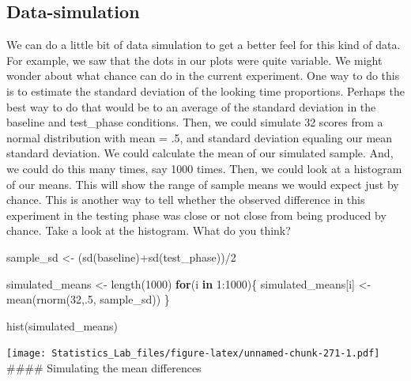 \documentclass[
]{book}
\newenvironment{Shaded}{\begin{snugshade}}{\end{snugshade}}
\newcommand{\ControlFlowTok}[1]{\textcolor[rgb]{0.13,0.29,0.53}{\textbf{#1}}}
\newcommand{\DecValTok}[1]{\textcolor[rgb]{0.00,0.00,0.81}{#1}}
\newcommand{\FunctionTok}[1]{\textcolor[rgb]{0.00,0.00,0.00}{#1}}
\newcommand{\NormalTok}[1]{#1}
\newcommand{\OtherTok}[1]{\textcolor[rgb]{0.56,0.35,0.01}{#1}}
\newcommand{\SpecialCharTok}[1]{\textcolor[rgb]{0.00,0.00,0.00}{#1}}
\begin{document}
\hypertarget{data-simulation}{%
\subsection{Data-simulation}\label{data-simulation}}

We can do a little bit of data simulation to get a better feel for this kind of data. For example, we saw that the dots in our plots were quite variable. We might wonder about what chance can do in the current experiment. One way to do this is to estimate the standard deviation of the looking time proportions. Perhaps the best way to do that would be to an average of the standard deviation in the baseline and test\_phase conditions. Then, we could simulate 32 scores from a normal distribution with mean = .5, and standard deviation equaling our mean standard deviation. We could calculate the mean of our simulated sample. And, we could do this many times, say 1000 times. Then, we could look at a histogram of our means. This will show the range of sample means we would expect just by chance. This is another way to tell whether the observed difference in this experiment in the testing phase was close or not close from being produced by chance. Take a look at the histogram. What do you think?

\begin{Shaded}
\begin{Highlighting}[]
\NormalTok{sample\_sd   }\OtherTok{\textless{}{-}}\NormalTok{ (}\FunctionTok{sd}\NormalTok{(baseline)}\SpecialCharTok{+}\FunctionTok{sd}\NormalTok{(test\_phase))}\SpecialCharTok{/}\DecValTok{2}

\NormalTok{simulated\_means }\OtherTok{\textless{}{-}} \FunctionTok{length}\NormalTok{(}\DecValTok{1000}\NormalTok{)}
\ControlFlowTok{for}\NormalTok{(i }\ControlFlowTok{in} \DecValTok{1}\SpecialCharTok{:}\DecValTok{1000}\NormalTok{)\{}
\NormalTok{ simulated\_means[i] }\OtherTok{\textless{}{-}} \FunctionTok{mean}\NormalTok{(}\FunctionTok{rnorm}\NormalTok{(}\DecValTok{32}\NormalTok{,.}\DecValTok{5}\NormalTok{, sample\_sd))}
\NormalTok{\}}

\FunctionTok{hist}\NormalTok{(simulated\_means)}
\end{Highlighting}
\end{Shaded}

\texttt{[image: Statistics\_Lab\_files/figure-latex/unnamed-chunk-271-1.pdf]}
\#\#\#\# Simulating the mean differences
\end{document}

